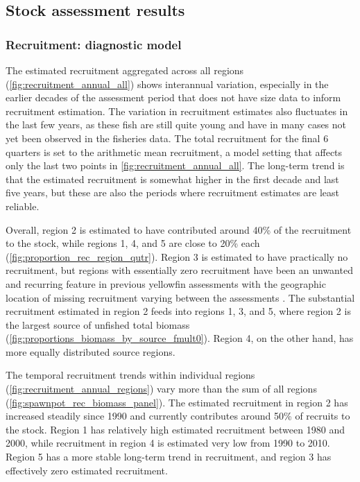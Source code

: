
\subsection{Stock assessment results}
\label{sec:stock_assess_results}

\subsubsection{Recruitment: diagnostic model}
\label{sec:recruitment_diag}

The estimated recruitment aggregated across all regions (\autoref{fig:recruitment_annual_all}) shows interannual variation, especially in the earlier decades of the assessment period that does not have size data to inform recruitment estimation. The variation in recruitment estimates also fluctuates in the last few years, as these fish are still quite young and have in many cases not yet been observed in the fisheries data. The total recruitment for the final 6 quarters is set to the arithmetic mean recruitment, a model setting that affects only the last two points in \autoref{fig:recruitment_annual_all}. The long-term trend is that the estimated recruitment is somewhat higher in the first decade and last five years, but these are also the periods where recruitment estimates are least reliable.

Overall, region 2 is estimated to have contributed around 40\% of the recruitment to the stock, while regions 1, 4, and 5 are close to 20\% each (\autoref{fig:proportion_rec_region_qutr}). Region 3 is estimated to have practically no recruitment, but regions with essentially zero recruitment have been an unwanted and recurring feature in previous yellowfin assessments \citep{davies_stock_2014,tremblay-boyer_stock_2017,vincent_stock_2020} with the geographic location of missing recruitment varying between the assessments \citep{hamer_report_2023}. The substantial recruitment estimated in region 2 feeds into regions 1, 3, and 5, where region 2 is the largest source of unfished total biomass (\autoref{fig:proportions_biomass_by_source_fmult0}). Region 4, on the other hand, has more equally distributed source regions.

The temporal recruitment trends within individual regions (\autoref{fig:recruitment_annual_regions}) vary more than the sum of all regions (\autoref{fig:spawnpot_rec_biomass_panel}). The estimated recruitment in region 2 has increased steadily since 1990 and currently contributes around 50\% of recruits to the stock. Region 1 has relatively high estimated recruitment between 1980 and 2000, while recruitment in region 4 is estimated very low from 1990 to 2010. Region 5 has a more stable long-term trend in recruitment, and region 3 has effectively zero estimated recruitment.

